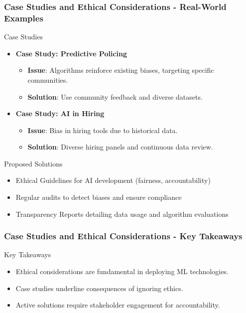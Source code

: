 \documentclass[aspectratio=169]{beamer}
\begin{document}
\begin{frame}[fragile]
    \frametitle{Case Studies and Ethical Considerations - Real-World Examples}
    \begin{block}{Case Studies}
        \begin{itemize}
            \item \textbf{Case Study: Predictive Policing}
                \begin{itemize}
                    \item \textbf{Issue}: Algorithms reinforce existing biases, targeting specific communities.
                    \item \textbf{Solution}: Use community feedback and diverse datasets.
                \end{itemize}
            \item \textbf{Case Study: AI in Hiring}
                \begin{itemize}
                    \item \textbf{Issue}: Bias in hiring tools due to historical data.
                    \item \textbf{Solution}: Diverse hiring panels and continuous data review.
                \end{itemize}
        \end{itemize}
    \end{block}

    \begin{block}{Proposed Solutions}
        \begin{itemize}
            \item Ethical Guidelines for AI development (fairness, accountability)
            \item Regular audits to detect biases and ensure compliance
            \item Transparency Reports detailing data usage and algorithm evaluations
        \end{itemize}
    \end{block}
\end{frame}

\begin{frame}[fragile]
    \frametitle{Case Studies and Ethical Considerations - Key Takeaways}
    \begin{block}{Key Takeaways}
        \begin{itemize}
            \item Ethical considerations are fundamental in deploying ML technologies.
            \item Case studies underline consequences of ignoring ethics.
            \item Active solutions require stakeholder engagement for accountability.
        \end{itemize}
    \end{block}
\end{frame}
\end{document}
